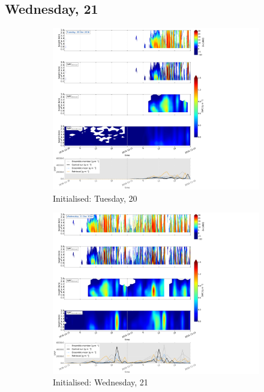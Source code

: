 \subsection{Wednesday, \SI{21}{\dec}}
\label{sec:vertEM09:2112}
\begin{figure}[h]
	\centering
	\begin{subfigure}[t]{\textwidth}
		\includegraphics[trim={0.4cm .4cm 31.3cm 63.5cm},clip,width=\textwidth]{./fig_SWC/20161220}
		\caption{Initialised: Tuesday, \SI{20}{\dec}}\label{fig:SWP20}
	\end{subfigure}
	\begin{subfigure}[t]{\textwidth}
		\includegraphics[trim={0.4cm .4cm 31.3cm 63.5cm},clip,width=\textwidth]{./fig_SWC/20161221}
		\caption{Initialised: Wednesday, \SI{21}{\dec}}\label{fig:SWP21}
	\end{subfigure}
	\caption{}\label{fig:SWP2021}
\end{figure}
